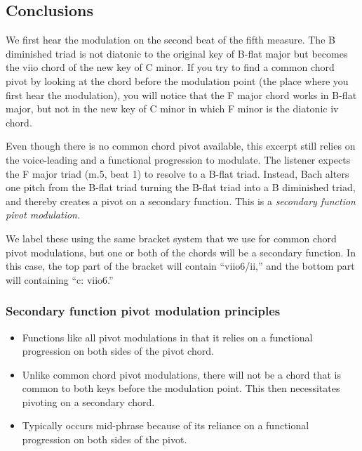 \documentclass{book}
\providecommand{\tightlist}{%
  \setlength{\itemsep}{0pt}\setlength{\parskip}{0pt}}
\begin{document}
\hypertarget{conclusions-55}{%
\subsection{Conclusions}\label{conclusions-55}}

We first hear the modulation on the second beat of the fifth measure. The B
diminished triad is not diatonic to the original key of B-flat major but
becomes the viio chord of the new key of C minor. If you try to find a common
chord pivot by looking at the chord before the modulation point (the place
where you first hear the modulation), you will notice that the F major chord
works in B-flat major, but not in the new key of C minor in which F minor is
the diatonic iv chord.

Even though there is no common chord pivot available, this excerpt still
relies on the voice-leading and a functional progression to modulate. The
listener expects the F major triad (m.5, beat 1) to resolve to a B-flat triad.
Instead, Bach alters one pitch from the B-flat triad turning the B-flat triad
into a B diminished triad, and thereby creates a pivot on a secondary
function. This is a \emph{secondary function pivot modulation}.

We label these using the same bracket system that we use for common chord
pivot modulations, but one or both of the chords will be a secondary function.
In this case, the top part of the bracket will contain ``viio6/ii,'' and the
bottom part will containing ``c: viio6.''

\hypertarget{secondary-function-pivot-modulation-principles}{%
\subsubsection{Secondary function pivot modulation
principles}\label{secondary-function-pivot-modulation-principles}}

\begin{itemize}
\tightlist
\item
  Functions like all pivot modulations in that it relies on a functional
  progression on both sides of the pivot chord.
\item
  Unlike common chord pivot modulations, there will not be a chord that is
  common to both keys before the modulation point. This then necessitates
  pivoting on a secondary chord.
\item
  Typically occurs mid-phrase because of its reliance on a functional
  progression on both sides of the pivot.
\end{itemize}
\end{document}
